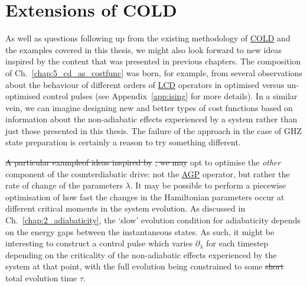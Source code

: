 \documentclass[a4paper,oneside,11pt]{book}
\newcommand{\dlambda}{\partial_{\lambda}}
\newcommand{\dotlambda}{\dot{\lambda}}
\newcommand{\acrref}[1]{\hyperref[acr:#1]{#1}}
\providecommand{\DIFaddtex}[1]{{\protect\color{blue}\uwave{#1}}} %
\providecommand{\DIFdeltex}[1]{{\protect\color{red}\sout{#1}}}                      %
\providecommand{\DIFaddbegin}{} %
\providecommand{\DIFaddend}{} %
\providecommand{\DIFdelbegin}{} %
\providecommand{\DIFdelend}{} %
\providecommand{\DIFadd}[1]{\texorpdfstring{\DIFaddtex{#1}}{#1}} %
\providecommand{\DIFdel}[1]{\texorpdfstring{\DIFdeltex{#1}}{}} %
\newcommand{\DIFscaledelfig}{0.5}
\newlength{\DIFdelgraphicswidth} %
\newlength{\DIFdelgraphicsheight} %
\newcommand{\DIFaddincludegraphics}[2][]{{\color{blue}\fbox{\DIFOincludegraphics[#1]{#2}}}} %
\newcommand{\DIFdelincludegraphics}[2][]{%
\sbox{\DIFdelgraphicsbox}{\DIFOincludegraphics[#1]{#2}}%
\settoboxwidth{\DIFdelgraphicswidth}{\DIFdelgraphicsbox} %
\settoboxtotalheight{\DIFdelgraphicsheight}{\DIFdelgraphicsbox} %
\scalebox{\DIFscaledelfig}{%
\parbox[b]{\DIFdelgraphicswidth}{\usebox{\DIFdelgraphicsbox}\\[-\baselineskip] \rule{\DIFdelgraphicswidth}{0em}}\llap{\resizebox{\DIFdelgraphicswidth}{\DIFdelgraphicsheight}{%
\setlength{\unitlength}{\DIFdelgraphicswidth}%
\begin{picture}(1,1)%
\thicklines\linethickness{2pt} %
{\color[rgb]{1,0,0}\put(0,0){\framebox(1,1){}}}%
{\color[rgb]{1,0,0}\put(0,0){\line( 1,1){1}}}%
{\color[rgb]{1,0,0}\put(0,1){\line(1,-1){1}}}%
\end{picture}%
}\hspace*{3pt}}} %
} %
\DeclareRobustCommand{\DIFaddbegin}{\DIFOaddbegin \let\includegraphics\DIFaddincludegraphics} %
\DeclareRobustCommand{\DIFaddend}{\DIFOaddend \let\includegraphics\DIFOincludegraphics} %
\DeclareRobustCommand{\DIFdelbegin}{\DIFOdelbegin \let\includegraphics\DIFdelincludegraphics} %
\DeclareRobustCommand{\DIFdelend}{\DIFOaddend \let\includegraphics\DIFOincludegraphics} %
\begin{document}
\section{Extensions of COLD}

As well as questions following up from the existing methodology of \acrref{COLD} and the examples covered in this thesis, we might also look forward to new ideas inspired by the content that was presented in previous chapters. The composition of Ch.~\ref{chap:5_cd_as_costfunc} was born, for example, from several observations about the behaviour of different orders of \acrref{LCD} operators in optimised versus un-optimised control pulses (see Appendix~\ref{app:ising} for more details). In a similar vein, we can imagine designing new and better types of cost functions based on information about the non-adiabatic effects experienced by a system rather than just those presented in this thesis. The failure of the approach in the case of GHZ state preparation is certainly a reason to try something different.

\DIFdelbegin \DIFdel{A particular exampleof ideas inspired by }%
\DIFdel{, we may }\DIFdelend \DIFaddbegin \DIFadd{We may, for example, }\DIFaddend opt to optimise the \emph{other} component of the counterdiabatic drive: not the \acrref{AGP} operator, but rather the rate of change of the parameters $\dotlambda$. It may be possible to perform a piecewise optimisation of how fast the changes in the Hamiltonian parameters occur at different critical moments in the system evolution. As discussed in Ch.~\ref{chap:2_adiabaticity}, the `slow' evolution condition for adiabaticity depends on the energy gaps between the instantaneous states. As such, it might be interesting to construct a control pulse which varies $\dlambda$ for each timestep depending on the criticality of the non-adiabatic effects experienced by the system at that point, with the full evolution being constrained to some \DIFdelbegin \DIFdel{short }\DIFdelend total evolution time $\tau$.
\end{document}
